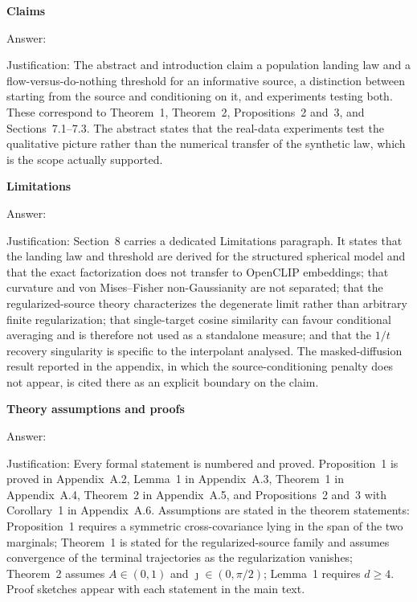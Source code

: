 
\item {\bf Claims}
    \item[] Answer: \answerYes{}
    \item[] Justification: The abstract and introduction claim a population landing law and a
    flow-versus-do-nothing threshold for an informative source, a distinction between starting
    from the source and conditioning on it, and experiments testing both. These correspond to
    Theorem~1, Theorem~2, Propositions~2 and~3, and Sections~7.1--7.3. The abstract states that
    the real-data experiments test the qualitative picture rather than the numerical transfer of
    the synthetic law, which is the scope actually supported.

\item {\bf Limitations}
    \item[] Answer: \answerYes{}
    \item[] Justification: Section~8 carries a dedicated Limitations paragraph. It states that
    the landing law and threshold are derived for the structured spherical model and that the
    exact factorization does not transfer to OpenCLIP embeddings; that curvature and von
    Mises--Fisher non-Gaussianity are not separated; that the regularized-source theory
    characterizes the degenerate limit rather than arbitrary finite regularization; that
    single-target cosine similarity can favour conditional averaging and is therefore not used as
    a standalone measure; and that the $1/t$ recovery singularity is specific to the interpolant
    analysed. The masked-diffusion result reported in the appendix, in which the
    source-conditioning penalty does not appear, is cited there as an explicit boundary on the
    claim.

\item {\bf Theory assumptions and proofs}
    \item[] Answer: \answerYes{}
    \item[] Justification: Every formal statement is numbered and proved. Proposition~1 is proved
    in Appendix~A.2, Lemma~1 in Appendix~A.3, Theorem~1 in Appendix~A.4, Theorem~2 in
    Appendix~A.5, and Propositions~2 and~3 with Corollary~1 in Appendix~A.6. Assumptions are
    stated in the theorem statements: Proposition~1 requires a symmetric cross-covariance lying
    in the span of the two marginals; Theorem~1 is stated for the regularized-source family and
    assumes convergence of the terminal trajectories as the regularization vanishes; Theorem~2
    assumes $A\in(0,1)$ and $\jmath\in(0,\pi/2)$; Lemma~1 requires $d\ge4$. Proof sketches appear
    with each statement in the main text.

